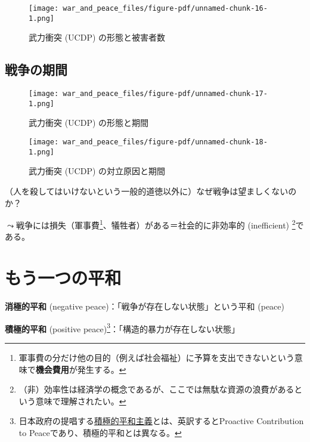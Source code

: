 \documentclass[
  xelatex,
  ja=standard]{bxjsarticle}
\begin{document}
\begin{figure}[htpb]

{\centering \texttt{[image: war\_and\_peace\_files/figure-pdf/unnamed-chunk-16-1.png]}

}

\caption{武力衝突 (UCDP) の形態と被害者数}

\end{figure}

\hypertarget{ux6226ux4e89ux306eux671fux9593}{%
\subsection{戦争の期間}\label{ux6226ux4e89ux306eux671fux9593}}

\begin{figure}[htpb]

{\centering \texttt{[image: war\_and\_peace\_files/figure-pdf/unnamed-chunk-17-1.png]}

}

\caption{武力衝突 (UCDP) の形態と期間}

\end{figure}

\begin{figure}[htpb]

{\centering \texttt{[image: war\_and\_peace\_files/figure-pdf/unnamed-chunk-18-1.png]}

}

\caption{武力衝突 (UCDP) の対立原因と期間}

\end{figure}

（人を殺してはいけないという一般的道徳以外に）なぜ戦争は望ましくないのか？

\(\leadsto\)戦争には損失（軍事費\footnote{軍事費の分だけ他の目的（例えば社会福祉）に予算を支出できないという意味で\textbf{機会費用}が発生する。}、犠牲者）がある＝社会的に非効率的
(inefficient) \footnote{（非）効率性は経済学の概念であるが、ここでは無駄な資源の浪費があるという意味で理解されたい。}である。

\hypertarget{ux3082ux3046ux4e00ux3064ux306eux5e73ux548c}{%
\section{もう一つの平和}\label{ux3082ux3046ux4e00ux3064ux306eux5e73ux548c}}

\textbf{消極的平和} (negative peace)：「戦争が存在しない状態」という平和
(peace)

\textbf{積極的平和} (positive
peace)\footnote{日本政府の提唱する\href{https://www.mofa.go.jp/mofaj/p_pd/dpr/page1w_000072.html}{積極的平和主義}とは、英訳するとProactive
  Contribution to Peaceであり、積極的平和とは異なる。}：「構造的暴力が存在しない状態」\citep{galtung1969, galtung1991}
\end{document}
